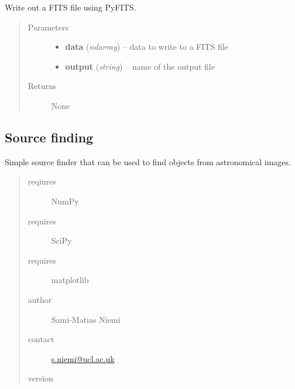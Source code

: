 \documentclass[a4paper,11pt,english]{sphinxmanual}
\begin{document}
\begin{fulllineitems}
\begin{fulllineitems}
Write out a FITS file using PyFITS.
\begin{quote}\begin{description}
\item[{Parameters}] \leavevmode\begin{itemize}
\item {} 
\textbf{data} (\emph{ndarray}) -- data to write to a FITS file

\item {} 
\textbf{output} (\emph{string}) -- name of the output file

\end{itemize}

\item[{Returns}] \leavevmode
None

\end{description}\end{quote}

\end{fulllineitems}


\end{fulllineitems}

\label{analysis:module-analysis.sourceFinder}

\subsection{Source finding}
\label{analysis:source-finding}
Simple source finder that can be used to find objects from astronomical images.
\begin{quote}\begin{description}
\item[{reqiures}] \leavevmode
NumPy

\item[{requires}] \leavevmode
SciPy

\item[{requires}] \leavevmode
matplotlib

\item[{author}] \leavevmode
Sami-Matias Niemi

\item[{contact}] \leavevmode
\href{mailto:s.niemi@ucl.ac.uk}{s.niemi@ucl.ac.uk}

\item[{version}] 

\end{description}\end{quote}
\end{document}

